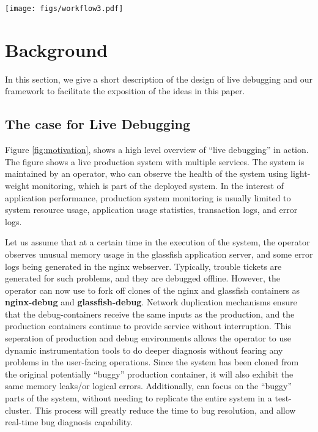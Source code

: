 
\begin{figure*}[ht!]
	\begin{center}
		\texttt{[image: figs/workflow3.pdf]}
		\caption{Workflow of \parikshan in a live multi-tier production system with several interacting services. When the administrator of the system observes errors in two of it's tiers, he can create a sandboxed clone of these tiers and observe/debug them in a sandbox environment without impacting the actual production system.}
		\label{fig:motivation}
	\end{center}
\end{figure*}


\section{Background}
\label{sec:background}

In this section, we give a short description of the design of live debugging and our \parikshan framework to facilitate the exposition of the ideas in this paper. 

\subsection{The case for Live Debugging}
\label{sec:case}

Figure \ref{fig:motivation}, shows a high level overview of ``live debugging'' in action. 
The figure shows a live production system with multiple services. 
The system is maintained by an operator, who can observe the health of the system using light-weight monitoring, which is part of the deployed system. 
In the interest of application performance, production system monitoring is usually limited to system resource usage, application usage statistics, transaction logs, and error logs.

Let us assume that at a certain time in the execution of the system, the operator observes unusual memory usage in the glassfish application server, and some error logs being generated in the nginx webserver. 
Typically, trouble tickets are generated for such problems, and they are debugged offline.
However, the operator can now use \parikshan to fork off clones of the nginx and glassfish containers as \textbf{nginx-debug} and \textbf{glassfish-debug}.
Network duplication mechanisms ensure that the debug-containers receive the same inputs as the production, and the production containers continue to provide service without interruption.
This seperation of production and debug environments allows the operator to use dynamic instrumentation tools to do deeper diagnosis without fearing any problems in the user-facing operations.
Since the system has been cloned from the original potentially ``buggy'' production container, it will also exhibit the same memory leaks/or logical errors.
Additionally, \parikshan can focus on the ``buggy'' parts of the system, without needing to replicate the entire system in a test-cluster. 
This process will greatly reduce the time to bug resolution, and allow real-time bug diagnosis capability.

